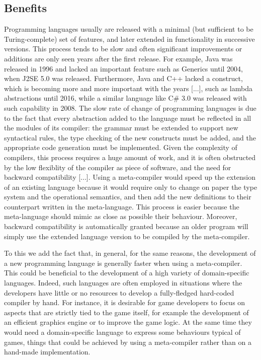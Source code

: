 \subsection{Benefits}
\label{sec:ch1_benefits}
Programming languages usually are released with a minimal (but sufficient to be Turing-complete) set of features, and later extended in functionality in successive versions. This process tends to be slow and often significant improvements or additions are only seen years after the first release. For example, Java was released in 1996 and lacked an important feature such as Generics until 2004, when J2SE 5.0 was released. Furthermore, Java and C++ lacked a construct, which is becoming more and more important with the years [...], such as lambda abstractions until 2016, while a similar language like C\# 3.0 was released with such capability in 2008. The slow rate of change of programming languages is due to the fact that every abstraction added to the language must be reflected in all the modules of its compiler: the grammar must be extended to support new syntactical rules, the type checking of the new constructs must be added, and the appropriate code generation must be implemented. Given the complexity of compilers, this process requires a huge amount of work, and it is often obstructed by the low flexiblity of the compiler as piece of software, and the need for backward compatibility [...]. Using a meta-compiler would speed up the extension of an existing language because it would require only to change on paper the type system and the operational semantics, and then add the new definitions to their counterpart written in the meta-language. This process is easier because the meta-language should mimic as close as possible their behaviour. Moreover, backward compatibility is automatically granted because an older program will simply use the extended language version to be compiled by the meta-compiler.

To this we add the fact that, in general, for the same reasons, the development of a new programming language is generally faster when using a meta-compiler. This could be beneficial to the development of a high variety of domain-specific languages. Indeed, such languages are often employed in situations where the developers have little or no resources to develop a fully-fledged hard-coded compiler by hand. For instance, it is desirable for game developers to focus on aspects that are strictly tied to the game itself, for example the development of an efficient graphics engine or to improve the game logic. At the same time they would need a domain-specific language to express some behaviours typical of games, things that could be achieved by using a meta-compiler rather than on a hand-made implementation.

